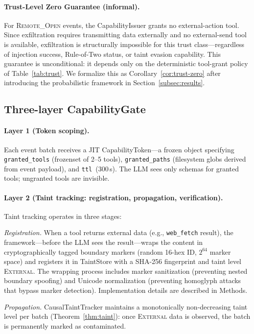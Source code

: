 \documentclass[pdflatex,sn-nature]{sn-jnl}%
\theoremstyle{thmstyleone}%
\theoremstyle{thmstyletwo}%
\theoremstyle{thmstylethree}%
\begin{document}
\paragraph{Trust-Level Zero Guarantee (informal).} For \textsc{Remote\_Open} events, the CapabilityIssuer grants no external-action tool. Since exfiltration requires transmitting data externally and no external-send tool is available, exfiltration is structurally impossible for this trust class---regardless of injection success, Rule-of-Two status, or taint evasion capability. This guarantee is unconditional: it depends only on the deterministic tool-grant policy of Table~\ref{tab:trust}. We formalize this as Corollary~\ref{cor:trust-zero} after introducing the probabilistic framework in Section~\ref{subsec:results}.

\subsection{Three-layer CapabilityGate}\label{subsec:capgate}

\paragraph{Layer 1 (Token scoping).} Each event batch receives a JIT CapabilityToken---a frozen object specifying \texttt{granted\_tools} (frozenset of 2--5 tools), \texttt{granted\_paths} (filesystem globs derived from event payload), and \texttt{ttl}~(300\,s). The LLM sees only schemas for granted tools; ungranted tools are invisible.

\paragraph{Layer 2 (Taint tracking: registration, propagation, verification).}

Taint tracking operates in three stages:

\emph{Registration.} When a tool returns external data (e.g., \texttt{web\_fetch} result), the framework---before the LLM sees the result---wraps the content in cryptographically tagged boundary markers (random 16-hex ID, $2^{64}$ marker space) and registers it in TaintStore with a SHA-256 fingerprint and taint level \textsc{External}. The wrapping process includes marker sanitization (preventing nested boundary spoofing) and Unicode normalization (preventing homoglyph attacks that bypass marker detection). Implementation details are described in Methods.

\emph{Propagation.} CausalTaintTracker maintains a monotonically non-decreasing taint level per batch (Theorem~\ref{thm:taint}): once \textsc{External} data is observed, the batch is permanently marked as contaminated.
\end{document}
